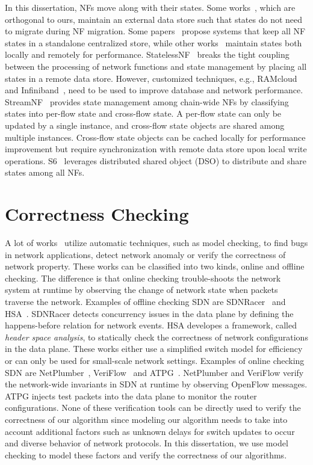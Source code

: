 In this dissertation, NFs move along with their states. Some
works~\cite{streamnf, stateless, elastic}, which are orthogonal to ours, maintain an external data
store such that states do not need to migrate during NF
migration. Some papers~\cite{stateless} propose systems that keep all NF states in a
standalone centralized store, while other works~\cite{streamnf,
  elastic} maintain states both locally and remotely for performance.
 StatelessNF~\cite{stateless} breaks the tight coupling between the processing of network functions and state management by placing all states in a remote data store. However, customized techniques, e.g., RAMcloud~\cite{ramcloud} and Infiniband~\cite{infiniband}, need to be used to improve database and network performance. StreamNF~\cite{streamnf} provides state management among chain-wide NFs by classifying states into per-flow state and cross-flow state.  A per-flow state can only be updated by a single instance, and cross-flow state objects are shared among multiple instances. Cross-flow state objects can be cached locally for performance improvement but require synchronization with remote data store upon local write operations. S6~\cite{elastic} leverages distributed shared object (DSO) to distribute and share states among all NFs.
 
\section{Correctness Checking}
\label{sec:check}
A lot of works~\cite{netplumber, hsa, sdnracer, nice, atpg, veriflow} utilize automatic techniques, such as model checking, to find bugs in network applications, detect network anomaly or verify the correctness of network property. These works can be classified into two kinds, online and offline checking. The difference is that online checking trouble-shoots the network system at runtime by observing the change of network state when packets traverse the network. Examples of offline checking SDN are SDNRacer~\cite{sdnracer} and HSA~\cite{hsa}. SDNRacer detects concurrency issues in the data plane by defining the happens-before relation for network events. HSA developes a framework, called \textit{header space analysis}, to statically check the correctness of network configurations in the data plane. These works either use a simplified switch model for efficiency or can only be used for small-scale network settings. Examples of online checking SDN are NetPlumber~\cite{netplumber}, VeriFlow~\cite{veriflow} and ATPG~\cite{atpg}. NetPlumber and VeriFlow verify the network-wide invariants in SDN at runtime by observing OpenFlow messages. ATPG injects test packets into the data plane to monitor the router configurations. None of these verification tools can be directly used to verify the correctness of our algorithm since modeling our algorithm needs to take into account additional factors such as unknown delays for switch updates to occur and diverse behavior of network protocols. In this dissertation, we use model checking to model these factors and verify the correctness of our algorithms.

